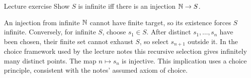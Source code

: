 \begin{exam}{Lecture exercise}
Show $S$ is infinite iff there is an injection $\mathbb N\to S$.
\end{exam}
\begin{answer}
An injection from infinite $\mathbb N$ cannot have finite target, so its existence forces $S$ infinite. Conversely, for infinite $S$, choose $s_1\in S$. After distinct $s_1,\ldots,s_n$ have been chosen, their finite set cannot exhaust $S$, so select $s_{n+1}$ outside it. In the choice framework used by the lecture notes this recursive selection gives infinitely many distinct points. The map $n\mapsto s_n$ is injective. This implication uses a choice principle, consistent with the notes' assumed axiom of choice.
\end{answer}

